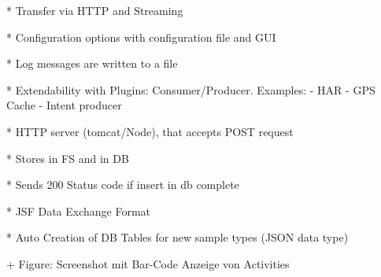 \documentclass[times, 10pt,twocolumn]{article}
\begin{document}
* Transfer via HTTP and Streaming

* Configuration options with configuration file and GUI

* Log messages are written to a file

* Extendability with Plugins: Consumer/Producer. Examples:
  - HAR
  - GPS Cache
  - Intent producer


* HTTP server (tomcat/Node), that accepts POST request

* Stores in FS and in DB

* Sends 200 Status code if insert in db complete

* JSF Data Exchange Format

* Auto Creation of DB Tables for new sample types (JSON data type)



+ Figure: Screenshot mit Bar-Code Anzeige von Activities
\end{document}
